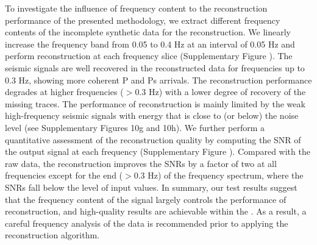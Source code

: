 To investigate the influence of frequency content to the reconstruction performance of the presented methodology, we extract different frequency contents of the incomplete synthetic data for the reconstruction.  We linearly increase the frequency band from 0.05 to 0.4 Hz at an interval of 0.05 Hz and perform reconstruction at each frequency slice (Supplementary Figure \color{blue}{10}\color{black}{}). The seismic signals are well recovered in the reconstructed data for frequencies up to 0.3 Hz, showing more coherent P and Ps arrivals. The reconstruction performance degrades at higher frequencies ($>$0.3 Hz) with a lower degree of recovery of the missing traces.  The performance of reconstruction is mainly limited by the weak high-frequency seismic signals with energy that is close to (or below) the noise level (see Supplementary Figures 10g and 10h). We further perform a quantitative assessment of the reconstruction quality by computing the SNR of the output signal at each frequency (Supplementary Figure \color{blue}{11}\color{black}{}). Compared with the raw data, the reconstruction improves the SNRs by a factor of two at all frequencies except for the  end ($>$0.3 Hz) of the frequency spectrum, where the SNRs fall below the level of input values. In summary, our test results suggest that the frequency content of the signal largely controls the performance of reconstruction, and high-quality results are achievable within the .  As a result, a careful frequency analysis of the data is recommended prior to applying the reconstruction algorithm.

